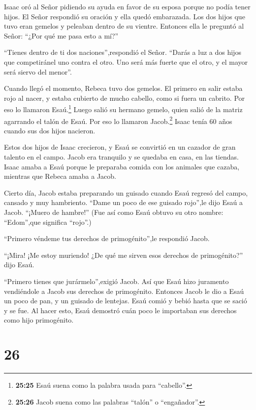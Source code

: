  Isaac oró al Señor pidiendo su ayuda en favor de su esposa
porque no podía tener hijos. El Señor respondió su oración y ella quedó
embarazada.  Los dos hijos que tuvo eran gemelos y peleaban
dentro de su vientre. Entonces ella le preguntó al Señor: ``¿Por qué me
pasa esto a mí?''

 ``Tienes dentro de ti dos naciones'',respondió el Señor.
``Darás a luz a dos hijos que competiránel uno contra el otro. Uno será
más fuerte que el otro, y el mayor será siervo del menor''.

 Cuando llegó el momento, Rebeca tuvo dos gemelos.
 El primero en salir estaba rojo al nacer, y estaba
cubierto de mucho cabello, como si fuera un cabrito. Por eso lo llamaron
Esaú.\footnote{\textbf{25:25} Esaú suena como la palabra usada para
  ``cabello''.}  Luego salió su hermano gemelo, quien salió
de la matriz agarrando el talón de Esaú. Por eso lo llamaron
Jacob.\footnote{\textbf{25:26} Jacob suena como las palabras ``talón'' o
  ``engañador''.} Isaac tenía 60 años cuando sus dos hijos nacieron.

 Estos dos hijos de Isaac crecieron, y Esaú se convirtió en
un cazador de gran talento en el campo. Jacob era tranquilo y se quedaba
en casa, en las tiendas.  Isaac amaba a Esaú porque le
preparaba comida con los animales que cazaba, mientras que Rebeca amaba
a Jacob.

 Cierto día, Jacob estaba preparando un guisado cuando Esaú
regresó del campo, cansado y muy hambriento.  ``Dame un
poco de ese guisado rojo'',le dijo Esaú a Jacob. ``¡Muero de hambre!''
(Fue así como Esaú obtuvo su otro nombre: ``Edom'',que significa
``rojo''.)

 ``Primero véndeme tus derechos de primogénito'',le
respondió Jacob.

 ``¡Mira! ¡Me estoy muriendo! ¿De qué me sirven esos
derechos de primogénito?'' dijo Esaú.

 ``Primero tienes que jurármelo'',exigió Jacob. Así que
Esaú hizo juramento vendiéndole a Jacob sus derechos de primogénito.
 Entonces Jacob le dio a Esaú un poco de pan, y un guisado
de lentejas. Esaú comió y bebió hasta que se sació y se fue. Al hacer
esto, Esaú demostró cuán poco le importaban sus derechos como hijo
primogénito.

\hypertarget{section-25}{%
\section{26}\label{section-25}}

